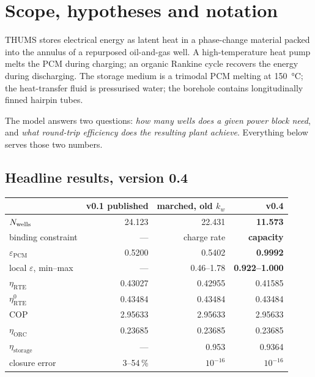 \section{Scope, hypotheses and notation}
\label{sec:overview}

THUMS stores electrical energy as latent heat in a phase-change material packed
into the annulus of a repurposed oil-and-gas well. A high-temperature heat pump
melts the PCM during charging; an organic Rankine cycle recovers the energy
during discharging. The storage medium is a trimodal PCM melting at
\SI{150}{\celsius}; the heat-transfer fluid is pressurised water; the borehole
contains longitudinally finned hairpin tubes.

The model answers two questions: \emph{how many wells does a given power block
need}, and \emph{what round-trip efficiency does the resulting plant achieve}.
Everything below serves those two numbers.

\subsection*{Headline results, version 0.4}

\begin{center}
\begin{tabular}{@{}l r r r@{}}
\toprule
 & v0.1 published & marched, old $k_{w}$ & \textbf{v0.4} \\
\midrule
$N_{\mathrm{wells}}$                     & 24.123 & 22.431 & \textbf{11.573} \\
binding constraint            & --- & charge rate & \textbf{capacity} \\
$\varepsilon_{\mathrm{PCM}}$  & 0.5200 & 0.5402 & \textbf{0.9992} \\
local $\varepsilon$, min--max & --- & 0.46--1.78 & \textbf{0.922--1.000} \\
$\eta_{\mathrm{RTE}}$         & 0.43027 & 0.42955 & 0.41585 \\
$\eta_{\mathrm{RTE}}^{0}$     & 0.43484 & 0.43484 & 0.43484 \\
$\mathrm{COP}$                & 2.95633 & 2.95633 & 2.95633 \\
$\eta_{\mathrm{ORC}}$         & 0.23685 & 0.23685 & 0.23685 \\
$\eta_{\mathrm{storage}}$     & --- & 0.953 & 0.9364 \\
closure error                 & 3--54\,\% & $10^{-16}$ & $10^{-16}$ \\
\bottomrule
\end{tabular}
\end{center}

